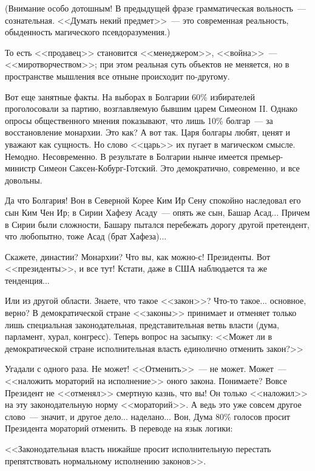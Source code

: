 \documentclass{scrbook}
\newcommand{\flqq}{<<}
\newcommand{\frqq}{>>}
\newcommand{\mdash}{~--- }
\begin{document}
(Внимание особо дотошным! В предыдущей фразе грамматическая вольность{\mdash}сознательная. {\flqq}Думать некий предмет{\frqq}{\mdash}это современная реальность, обыденность магического псевдоразумения.)

То есть {\flqq}продавец{\frqq} становится {\flqq}менеджером{\frqq}, {\flqq}война{\frqq}{\mdash}{\flqq}миротворчеством{\frqq}; при этом реальная суть объектов не меняется, но в пространстве мышления все отныне происходит по-другому.

Вот еще занятные факты. На выборах в Болгарии 60\% избирателей проголосовали за партию, возглавляемую бывшим царем Симеоном II. Однако опросы общественного мнения показывают, что лишь 10\% болгар{\mdash}за восстановление монархии. Это как? А вот так. Царя болгары любят, ценят и уважают как сущность. Но слово {\flqq}царь{\frqq} их пугает в магическом смысле. Немодно. Несовременно. В результате в Болгарии нынче имеется премьер-министр Симеон Саксен-Кобург-Готский. Это демократично, современно, и все довольны.

Да что Болгария! Вон в Северной Корее Ким Ир Сену спокойно наследовал его сын Ким Чен Ир; в Сирии Хафезу Асаду{\mdash}опять же сын, Башар Асад... Причем в Сирии были сложности, Башару пытался перебежать дорогу другой претендент, что любопытно, тоже Асад (брат Хафеза)...

Скажете, династии? Монархии? Что вы, как можно-с! Президенты. Вот {\flqq}президенты{\frqq}, и все тут! Кстати, даже в США наблюдается та же тенденция...

Или из другой области. Знаете, что такое {\flqq}закон{\frqq}? Что-то такое... основное, верно? В демократической стране {\flqq}законы{\frqq} принимает и отменяет только лишь специальная законодательная, представительная ветвь власти (дума, парламент, хурал, конгресс). Теперь вопрос на засыпку: {\flqq}Может ли в демократической стране исполнительная власть единолично отменить закон?{\frqq}

Угадали с одного раза. Не может! {\flqq}Отменить{\frqq}{\mdash}не может. Может{\mdash}{\flqq}наложить мораторий на исполнение{\frqq} оного закона. Понимаете? Вовсе Президент не {\flqq}отменял{\frqq} смертную казнь, что вы! Он только {\flqq}наложил{\frqq} на эту законодательную норму {\flqq}мораторий{\frqq}. А ведь это уже совсем другое слово{\mdash}значит, и другое дело... наделано... Вон, Дума 80\% голосов просит Президента мораторий отменить. В переводе на язык логики:

{\flqq}Законодательная власть нижайше просит исполнительную перестать препятствовать нормальному исполнению законов{\frqq}.
\end{document}
